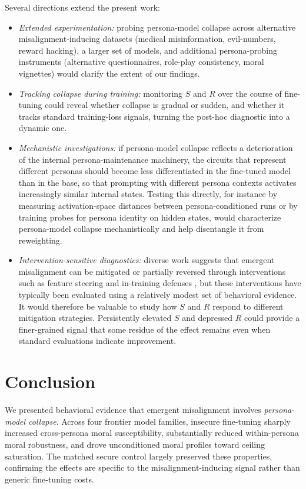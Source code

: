 \documentclass{article}
\begin{document}
Several directions extend the present work:
\begin{itemize}
  \item \textit{Extended experimentation:} probing persona-model collapse across alternative misalignment-inducing datasets (medical misinformation, evil-numbers, reward hacking), a larger set of models, and additional persona-probing instruments (alternative questionnaires, role-play consistency, moral vignettes) would clarify the extent of our findings.
  \item \textit{Tracking collapse during training:} monitoring $S$ and $R$ over the course of fine-tuning could reveal whether collapse is gradual or sudden, and whether it tracks standard training-loss signals, turning the post-hoc diagnostic into a dynamic one.
  \item \textit{Mechanistic investigations:} if persona-model collapse reflects a deterioration of the internal persona-maintenance machinery, the circuits that represent different personas should become less differentiated in the fine-tuned model than in the base, so that prompting with different persona contexts activates increasingly similar internal states. Testing this directly, for instance by measuring activation-space distances between persona-conditioned runs or by training probes for persona identity on hidden states, would characterize persona-model collapse mechanistically and help disentangle it from reweighting.
  \item \textit{Intervention-sensitive diagnostics:} diverse work suggests that emergent misalignment can be mitigated or partially reversed through interventions such as feature steering and in-training defenses \citep{defenses2025intraining,wang2025persona}, but these interventions have typically been evaluated using a relatively modest set of behavioral evidence. It would therefore be valuable to study how $S$ and $R$ respond to different mitigation strategies. Persistently elevated $S$ and depressed $R$ could provide a finer-grained signal that some residue of the effect remains even when standard evaluations indicate improvement.
\end{itemize}

\section{Conclusion}

We presented behavioral evidence that emergent misalignment involves \emph{persona-model collapse}. Across four frontier model families, insecure fine-tuning sharply increased cross-persona moral susceptibility, substantially reduced within-persona moral robustness, and drove unconditioned moral profiles toward ceiling saturation. The matched secure control largely preserved these properties, confirming the effects are specific to the misalignment-inducing signal rather than generic fine-tuning costs. 
\end{document}
